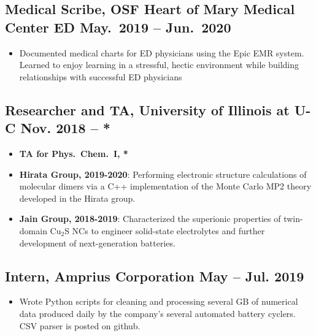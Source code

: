 \documentclass{article}
\begin{document}
\subsection{Medical Scribe, OSF Heart of Mary Medical Center ED
	\hfill May.\ 2019 -- Jun.\ 2020}

\begin{itemize}[noitemsep,nolistsep]
	\item Documented medical charts for ED physicians using the Epic EMR
	system. Learned to enjoy learning in a stressful, hectic environment
	while building relationships with successful ED physicians
\end{itemize}

\subsection{Researcher and TA, University of Illinois at U-C
            \hfill Nov. 2018 -- *}
\begin{itemize}[noitemsep,nolistsep]
	\item \textbf{TA for Phys.\ Chem.\ I, *}

	\item \textbf{Hirata Group, 2019-2020}: Performing electronic structure
	calculations of molecular dimers via a C++ implementation of the Monte
	Carlo MP2 theory developed in the Hirata group.

	\item \textbf{Jain Group, 2018-2019}: Characterized the superionic
	properties of twin-domain Cu$_2$S NCs to engineer solid-state
	electrolytes and further development of next-generation batteries.
\end{itemize}
\subsection{Intern, Amprius Corporation \hfill May -- Jul. 2019}
\begin{itemize}[noitemsep,nolistsep]
	\item Wrote Python scripts for cleaning and processing several GB of
	numerical data produced daily by the company's several automated battery
	cyclers. CSV parser is posted on github.
\end{itemize}
\end{document}
